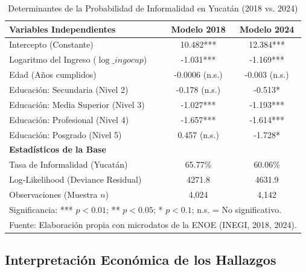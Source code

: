 \begin{table}[htbp]
  \centering
  \caption{Determinantes de la Probabilidad de Informalidad en Yucatán (2018 vs. 2024)}
  \label{tab:modelos_comparativos}
    \begin{tabular}{lcc}
    \toprule
    \textbf{Variables Independientes} & \textbf{Modelo 2018} & \textbf{Modelo 2024} \\
    \midrule
    Intercepto (Constante) & 10.482*** & 12.384*** \\
    Logaritmo del Ingreso ($\log\_ingocup$) & -1.031*** & -1.169*** \\
    Edad (Años cumplidos) & -0.0006 (n.s.) & -0.003 (n.s.) \\
    Educación: Secundaria (Nivel 2) & -0.178 (n.s.) & -0.513* \\
    Educación: Media Superior (Nivel 3) & -1.027*** & -1.193*** \\
    Educación: Profesional (Nivel 4) & -1.657*** & -1.614*** \\
    Educación: Posgrado (Nivel 5) & 0.457 (n.s.) & -1.728* \\
    \midrule
    \textbf{Estadísticos de la Base} & & \\
    Tasa de Informalidad (Yucatán) & 65.77\% & 60.06\% \\
    Log-Likelihood (Deviance Residual) & 4271.8 & 4631.9 \\
    Observaciones (Muestra $n$) & 4,024 & 4,142 \\
    \bottomrule
    \multicolumn{3}{l}{\small Significancia: *** $p<0.01$; ** $p<0.05$; * $p<0.1$; n.s. = No significativo.} \\
    \multicolumn{3}{l}{\small Fuente: Elaboración propia con microdatos de la ENOE (INEGI, 2018, 2024).}
    \end{tabular}
\end{table}

\subsection{Interpretación Económica de los Hallazgos}

